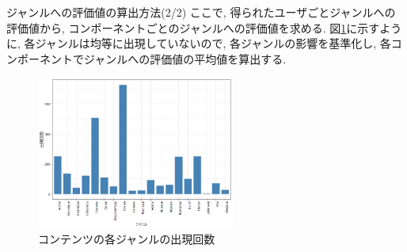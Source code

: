 \documentclass[dvipdfmx]{beamer} %
\newcommand{\backupend}{
\addtocounter{framenumberappendix}{-\value{framenumber}}
\addtocounter{framenumber}{\value{framenumberappendix}}
}
\begin{document}
\begin{frame}{ジャンルへの評価値の算出方法(2/2)}
\noindent
ここで, 得られたユーザごとジャンルへの評価値から, コンポーネントごとのジャンルへの評価値を求める. 図\ref{genre_count}に示すように, 各ジャンルは均等に出現していないので, 各ジャンルの影響を基準化し, 各コンポーネントでジャンルへの評価値の平均値を算出する.

\begin{figure}[htbp]
\begin{center}
\includegraphics[clip,height= 50mm]{data/genre_count.png}
\end{center}
\caption{コンテンツの各ジャンルの出現回数}
\label{genre_count}
\end{figure}
\end{frame}
	
\backupend
\end{document}
